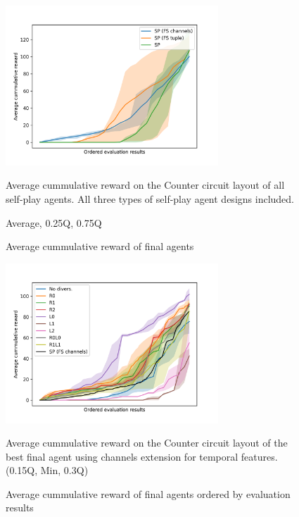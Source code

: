 \begin{figure}[!ht]
    \centering
    \includegraphics*[width=8cm]{../img/CounterCircuitFSVariantsOrderedAvg.png}

    \caption{Average cummulative reward of final agents}
    \label{CounterCircuitFSVariantsOrderedAvg}
    \medskip
    \small 
    Average cummulative reward on the Counter circuit layout of all self-play agents.
    All three types of self-play agent designs included.

    Average, 0.25Q, 0.75Q

\end{figure}


\begin{figure}[!ht]
    \centering
    \includegraphics*[width=8cm]{../img/CounterCircuitFSChannelsOrderedQ15.png}

    \caption{Average cummulative reward of final agents ordered by evaluation results}
    \label{CounterCircuitFSChannelsOrderedQ15}
    \medskip
    \small 
    Average cummulative reward on the Counter circuit layout of the best final agent using channels extension for temporal features.    
    (0.15Q, Min, 0.3Q)

\end{figure}

